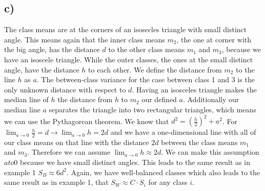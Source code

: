\documentclass[paper=a4,fontsize=10pt,DIV11,BCOR10mm]{scrartcl}
\begin{document}
\subsection*{c)}
The class means are at the corners of an isosecles triangle with small distinct angle. This means again that the inner class means $m_2$, the one at corner with the big angle, has the distance $d$ to the other class means $m_1$ and $m_3$, because we have an isoscele triangle. While the outer classes, the ones at the small distinct angle, have the distance $h$ to each other. We define the distance from $m_2$ to the line $h$ as $a$. The between-class variance for the case between class 1 and 3 is the only unknown distance with respect to $d$. Having an isosceles triangle makes the median line of $h$ the distance from $h$ to $m_2$ our defined $a$. Additionally our median line $a$ separates the triangle into two rectangular triangles, which means we can use the Pythagorean theorem. We know that $ d^2 = (\frac{h}{2})^2 + a^2$. For $\lim_{a \to 0} \frac{h}{2} = d \rightarrow \lim_{a \to 0} h = 2d $ and we have a one-dimensional line with all of our class means on that line with the distance $2d$ between the class means $m_1$ and $m_3$. Therefore we can assume $\lim_{a \to 0}h \approx 2d$. We can make this assumption $a to 0$ because we have small distinct angles. This leads to the same result as in example 1 $S_B \approx 6d^2$.
Again, we have well-balanced classes which also leads to the same result as in example 1, that $S_W \approx C \cdot S_i$ for any class $i$.

\end{document}
